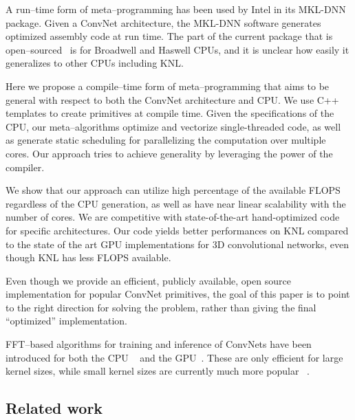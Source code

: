   A run--time form of meta--programming has
  been used by Intel in its MKL-DNN package.  Given a ConvNet
  architecture, the MKL-DNN software generates optimized assembly code
  at run time.  The part of the current package that is
  open--sourced~\cite{idlf,mkl-dnn} is for Broadwell and Haswell CPUs,
  and it is unclear how easily it generalizes to other CPUs including
  KNL.

  Here we propose a compile--time form of meta--programming
  that aims to be general with respect to both the ConvNet
  architecture and CPU.  We use C++ templates to create primitives at
  compile time.  Given the specifications of the CPU, our
  meta--algorithms optimize and vectorize single-threaded code, as
  well as generate static scheduling for parallelizing the computation
  over multiple cores.  Our approach tries to achieve generality by
  leveraging the power of the compiler.


  We show that our approach can utilize high percentage of the
  available FLOPS regardless of the CPU generation, as well as have
  near linear scalability with the number of cores.  We are
  competitive with state-of-the-art hand-optimized code for specific
  architectures.  Our code yields better performances on KNL
  compared to the state of the art GPU implementations for 3D
  convolutional networks, even though KNL has less FLOPS available.

  Even though we provide an efficient, publicly available, open source
  implementation for popular ConvNet primitives, the goal of this
  paper is to point to the right direction for solving the problem,
  rather than giving the final ``optimized'' implementation.

  FFT--based algorithms for training and inference of ConvNets have
  been introduced for both the CPU
  ~\cite{zlateski2016znn,zlateski2016znni} and the
  GPU~\cite{mathieu-iclr-14,vasilache2014fast}.  These are only
  efficient for large kernel sizes, while small kernel sizes are
  currently much more popular
  ~\cite{szegedy2015going,ronneberger2015u, simonyan2014very,
    sermanet2013overfeat, long2015fully, tran2015learning, ji20133d,
    maturana_iros_2015, maturana_icra_2014}.

  \subsection{Related work}

